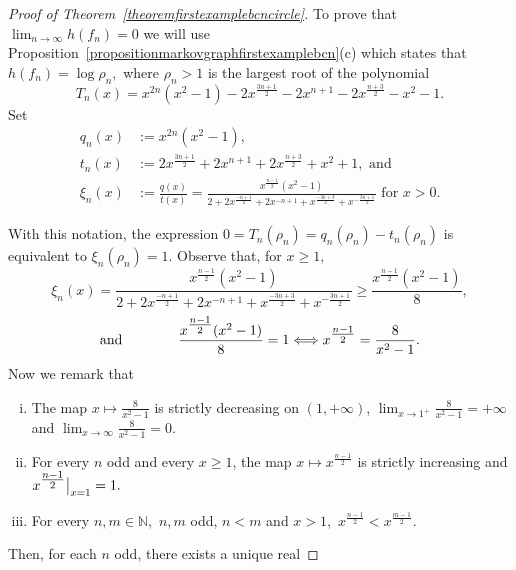 \documentclass[a4paper, 11pt]{amsart}
\numberwithin{equation}{section}
\theoremstyle{customnumberedtheorem}
\theoremstyle{definitionwithbfnote}
\newcommand{\N}{\ensuremath{\mathbb{N}}}
\newcommand{\evalat}[1]{\bigr\rvert\sb{#1}}
\begin{document}
\begin{proof}[Proof of Theorem~\ref{theoremfirstexamplebcncircle}]
To prove that $\lim_{n\to\infty} h(f_n) = 0$ we will use
Proposition~\ref{propositionmarkovgraphfirstexamplebcn}(c)
which states that
$h(f_n) = \log \rho_n,$ where $\rho_n > 1$ is the largest root
of the polynomial
\[
    T_n(x)  = x^{2n}(x^2 - 1) -2x^{\tfrac{3n+1}{2}} -2x^{n+1}-2x^{\tfrac{n+3}{2}} -x^2 -1.
\]
Set
\begin{align*}
q_n(x) & := x^{2n}(x^2 - 1),\\
t_n(x) & := 2x^{\tfrac{3n+1}{2}} +2x^{n+1}+2x^{\tfrac{n+3}{2}} +x^2 +1,\text{ and}\\
\xi_n(x) & := \frac{q(x)}{t(x)} =
  \frac{x^{\tfrac{n-1}{2}}(x^2 -1)}{2 + 2x^{\tfrac{-n+1}{2}} + 2 x^{-n +1} + x^{\tfrac{-3n+3}{2}} + x^{-\tfrac{3n+1}{2}}}
  \text{ for $x > 0$.}
\end{align*}

With this notation, the expression
$0 = T_n(\rho_n) = q_n(\rho_n) - t_n(\rho_n)$
is equivalent to
$\xi_n(\rho_n) = 1.$
Observe that, for $x \ge 1,$
\begin{equation}\label{ineqxi}
\xi_n(x) = \frac{x^{\tfrac{n-1}{2}}(x^2 -1)}{2 + 2x^{\tfrac{-n+1}{2}} + 2 x^{-n +1} + x^{\tfrac{-3n+3}{2}} + x^{-\tfrac{3n+1}{2}}}
\ge \frac{x^{\tfrac{n-1}{2}}(x^2 -1)}{8},
\end{equation}
\[
\text{and}\hspace*{4em}\frac{x^{\tfrac{n-1}{2}}(x^2 -1)}{8} = 1 \Longleftrightarrow x^{\tfrac{n-1}{2}} = \frac{8}{x^2 -1}.
\]
Now we remark that\par\par\bigskip\par\par\noindent
\begin{minipage}{0.63\textwidth}
\begin{enumerate}[(i)]
\item The map $x \mapsto \frac{8}{x^2 -1}$ is strictly decreasing on $(1,+\infty)$,
      $\lim_{x\to1^+} \frac{8}{x^2 -1} = +\infty$ and
      $\lim_{x\to\infty} \frac{8}{x^2 -1} = 0.$
\item For every $n$ odd and every $x \ge 1$,
      the map $x \mapsto x^{\tfrac{n-1}{2}}$ is strictly increasing and
      $x^{\tfrac{n-1}{2}}\evalat{x=1} = 1.$
\item For every $n,m \in \N,$  $n,m$ odd, $n < m$ and $x > 1,$
      $x^{\tfrac{n-1}{2}} < x^{\tfrac{m-1}{2}}.$
\end{enumerate}
Then, for each $n$ odd, there exists a unique real
\end{minipage}\hfill\begin{minipage}{0.35\textwidth}\flushright{}
\end{minipage}
\end{proof}
\end{document}
